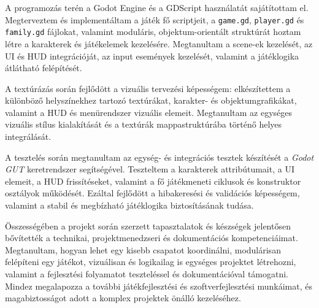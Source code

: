 \documentclass[12pt,a4paper]{article}
\begin{document}
A programozás terén a Godot Engine és a GDScript használatát sajátítottam el. Megterveztem és implementáltam a játék fő scriptjeit, a \texttt{game.gd}, \texttt{player.gd} és \texttt{family.gd} fájlokat, valamint moduláris, objektum-orientált struktúrát hoztam létre a karakterek és játékelemek kezelésére. Megtanultam a scene-ek kezelését, az UI és HUD integrációját, az input események kezelését, valamint a játéklogika átlátható felépítését.

A textúrázás során fejlődött a vizuális tervezési képességem: elkészítettem a különböző helyszínekhez tartozó textúrákat, karakter- és objektumgrafikákat, valamint a HUD és menürendszer vizuális elemeit. Megtanultam az egységes vizuális stílus kialakítását és a textúrák mappastruktúrába történő helyes integrálását.

A tesztelés során megtanultam az egység- és integrációs tesztek készítését a \emph{Godot GUT} keretrendszer segítségével. Teszteltem a karakterek attribútumait, a UI elemeit, a HUD frissítéseket, valamint a fő játékmeneti ciklusok és konstruktor osztályok működését. Ezáltal fejlődött a hibakeresési és validációs képességem, valamint a stabil és megbízható játéklogika biztosításának tudása.

Összességében a projekt során szerzett tapasztalatok és készségek jelentősen bővítették a technikai, projektmenedzseri és dokumentációs kompetenciáimat. Megtanultam, hogyan lehet egy kisebb csapatot koordinálni, modulárisan felépíteni egy játékot, vizuálisan és logikailag is egységes projektet létrehozni, valamint a fejlesztési folyamatot teszteléssel és dokumentációval támogatni. Mindez megalapozza a további játékfejlesztési és szoftverfejlesztési munkáimat, és magabiztosságot adott a komplex projektek önálló kezeléséhez.

\clearpage




\newpage


\end{document}
